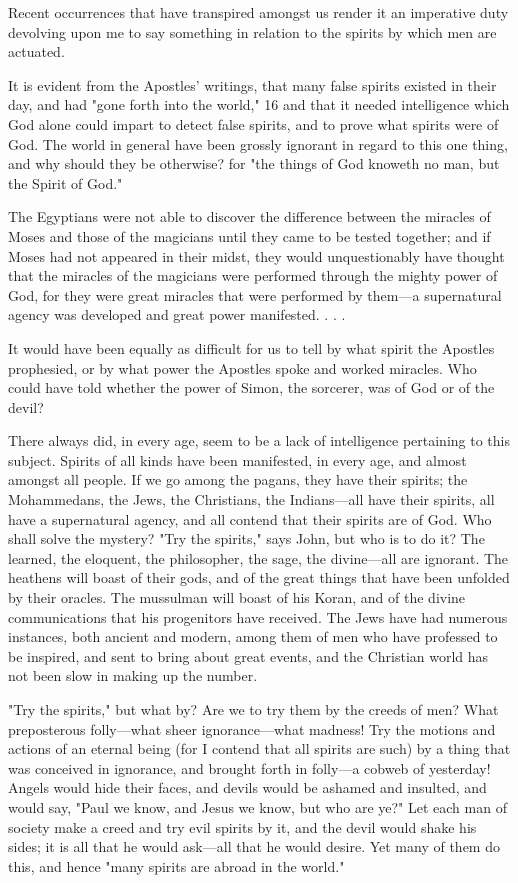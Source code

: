 Recent occurrences that have transpired amongst us render it an imperative duty devolving
upon me to say something in relation to the spirits by which men are actuated.

It is evident from the Apostles' writings, that many false spirits existed in their day, and had
"gone forth into the world," 16 and that it needed intelligence which God alone could impart
to detect false spirits, and to prove what spirits were of God. The world in general have been
grossly ignorant in regard to this one thing, and why should they be otherwise? for "the
things of God knoweth no man, but the Spirit of God."

The Egyptians were not able to discover the difference between the miracles of Moses and
those of the magicians until they came to be tested together; and if Moses had not appeared
in their midst, they would unquestionably have thought that the miracles of the magicians
were performed through the mighty power of God, for they were great miracles that were
performed by them—a supernatural agency was developed and great power manifested. . . .

It would have been equally as difficult for us to tell by what spirit the Apostles prophesied, or
by what power the Apostles spoke and worked miracles. Who could have told whether the
power of Simon, the sorcerer, was of God or of the devil?

There always did, in every age, seem to be a lack of intelligence pertaining to this subject.
Spirits of all kinds have been manifested, in every age, and almost amongst all people. If we
go among the pagans, they have their spirits; the Mohammedans, the Jews, the Christians, the
Indians—all have their spirits, all have a supernatural agency, and all contend that their
spirits are of God. Who shall solve the mystery? "Try the spirits," says John, but who is to do
it? The learned, the eloquent, the philosopher, the sage, the divine—all are ignorant. The
heathens will boast of their gods, and of the great things that have been unfolded by their
oracles. The mussulman will boast of his Koran, and of the divine communications that his
progenitors have received. The Jews have had numerous instances, both ancient and modern,
among them of men who have professed to be inspired, and sent to bring about great events,
and the Christian world has not been slow in making up the number.

"Try the spirits," but what by? Are we to try them by the creeds of men? What preposterous
folly—what sheer ignorance—what madness! Try the motions and actions of an eternal being
(for I contend that all spirits are such) by a thing that was conceived in ignorance, and
brought forth in folly—a cobweb of yesterday! Angels would hide their faces, and devils
would be ashamed and insulted, and would say, "Paul we know, and Jesus we know, but who
are ye?" Let each man of society make a creed and try evil spirits by it, and the devil would
shake his sides; it is all that he would ask—all that he would desire. Yet many of them do
this, and hence "many spirits are abroad in the world."

